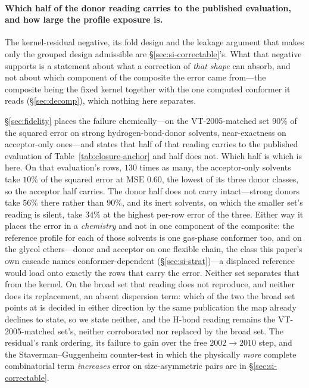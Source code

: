 \paragraph{Which half of the donor reading carries to the published evaluation, and how large the profile exposure is.}
The kernel-residual negative, its fold design and the leakage argument that makes only the grouped
design admissible are \S\ref{sec:si-correctable}'s. What that negative supports is a statement about
what a correction of \emph{that shape} can absorb, and not about which component of the composite
the error came from---the composite being the fixed kernel together with the one computed conformer
it reads (\S\ref{sec:decomp}), which nothing here separates.

\S\ref{sec:fidelity} places the failure chemically---on the VT-2005-matched set $90\%$ of the
squared error on strong hydrogen-bond-donor solvents, near-exactness on acceptor-only ones---and
states that half of that reading carries to the published evaluation of
Table~\ref{tab:closure-anchor} and half does not. Which half is which is here.
On that evaluation's rows, $130$ times as many, the acceptor-only solvents take $10\%$
of the squared error at $\mathrm{MSE}$ $0.60$, the lowest of its three donor classes, so the
acceptor half carries. The donor
half does not carry intact---strong donors take $56\%$ there rather than $90\%$, and its inert
solvents, on which the smaller set's reading is silent, take $34\%$ at the highest per-row error
of the three. Either way it places the error in a \emph{chemistry} and not in one component of the
composite: the reference profile for each of those solvents is one gas-phase conformer too, and on
the glycol ethers---donor and acceptor on one flexible chain, the class
this paper's own cascade names conformer-dependent (\S\ref{sec:si-strat})---a displaced reference
would load onto exactly the rows that carry the error. Neither set separates that from the kernel.
On the broad set that reading does not reproduce, and neither does its
replacement, an absent dispersion term: which of the two the broad set points at is decided in either
direction by the same publication the map already declines to state, so we state neither, and the
H-bond reading remains the VT-2005-matched set's, neither corroborated nor replaced by the broad set.
The residual's rank ordering, its failure to gain over the free $2002\to2010$ step,
and the Staverman--Guggenheim counter-test in which the physically \emph{more} complete
combinatorial term \emph{increases} error on size-asymmetric pairs are in \S\ref{sec:si-correctable}.

